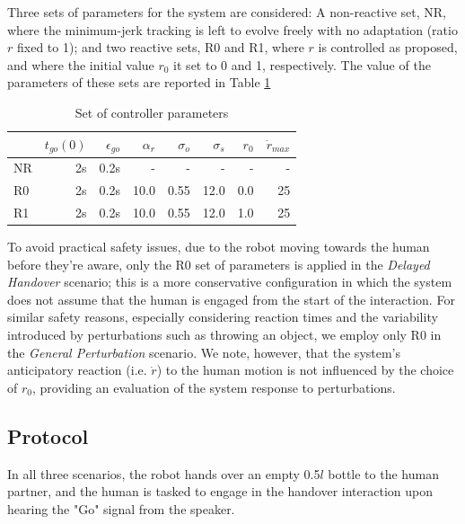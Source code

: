 \documentclass[lettersize,journal]{IEEEtran}
\begin{document}
Three sets of parameters for the system are considered: A non-reactive set, NR, where the minimum-jerk tracking is left to evolve freely with no adaptation (ratio $r$ fixed to 1); and two reactive sets, R0 and R1, where $r$ is controlled as proposed, and where the initial value $r_0$ it set to 0 and 1, respectively.
The value of the parameters of these sets are reported in Table \ref{tab:parameters_set}

\begin{table}[h!]
    \caption{Set of controller parameters}
    \label{tab:DMP_params}
    \begin{center}
        \begin{tabular}{l|rrrrrrr}
            & $t_{go}(0)$ & $\epsilon_{go}$ & $\alpha_r$ & $\sigma_o$ & $\sigma_s$ & $r_0$ & $\dot{r}_{max}$\\
            \midrule
            NR & 2s & 0.2s & - & - & - & - & -\\
            R0 & 2s & 0.2s & 10.0 & 0.55& 12.0 & 0.0 & 25\\
            R1 & 2s & 0.2s & 10.0 & 0.55& 12.0 & 1.0 & 25\\
        \end{tabular}
    \end{center}
    \label{tab:parameters_set}
\end{table}
To avoid practical safety issues, due to the robot moving towards the human before they're aware, only the R0 set of parameters is applied in the \textit{Delayed Handover} scenario; this is a more conservative configuration in which the system does not assume that the human is engaged from the start of the interaction.
For similar safety reasons, especially considering reaction times and the variability introduced by perturbations such as throwing an object, we employ only R0 in the \textit{General Perturbation} scenario.
We note, however, that the system's anticipatory reaction (i.e. $\dot r$) to the human motion is not influenced by the choice of $r_0$, providing an evaluation of the system response to perturbations.

\subsection{Protocol}
\label{subsec:protocol}

\noindent
In all three scenarios, the robot hands over an empty 0.5$l$ bottle to the human partner, and the human is tasked to engage in the handover interaction upon hearing the "Go" signal from the speaker. 
\end{document}
